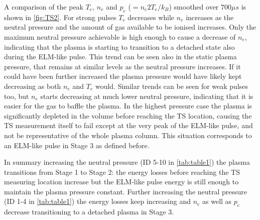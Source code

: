 A comparison of the peak $T_e$, $n_e$ and $p_e$ ($=n_e2T_e/k_B$) smoothed over $700 \mu s$ is shown in \autoref{fig:TS2}. For strong pulses $T_e$ decreases while $n_e$ increases as the neutral pressure and the amount of gas available to be ionised increases. Only the maximum neutral pressure achievable is high enough to cause a decrease of $n_e$, indicating that the plasma is starting to transition to a detached state also during the ELM-like pulse. This trend can be seen also in the static plasma pressure, that remains at similar levels as the neutral pressure increases. If it could have been further increased the plasma pressure would have likely kept decreasing as both $n_e$ and $T_e$ would. Similar trends can be seen for weak pulses too, but $n_e$ starts decreasing at much lower neutral pressure, indicating that it is easier for the gas to baffle the plasma. In the highest pressure case the plasma is significantly depleted in the volume before reaching the TS location, causing the TS measurement itself to fail except at the very peak of the ELM-like pulse, and not be representative of the whole plasma column. This situation corresponds to an ELM-like pulse in Stage 3 as defined before.

In summary increasing the neutral pressure (ID 5-10 in \autoref{tab:table1}) the plasma transitions from Stage 1 to Stage 2: the energy losses before reaching the TS measuring location increase but the ELM-like pulse energy is still enough to maintain the plasma pressure constant. Further increasing the neutral pressure (ID 1-4 in \autoref{tab:table1}) the energy losses keep increasing and $n_e$ as well as $p_e$ decrease transitioning to a detached plasma in Stage 3.



